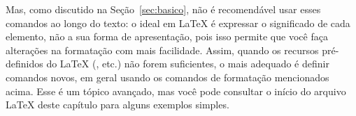 Mas, como discutido na Seção~\ref{sec:basico}, não é recomendável
usar esses comandos ao longo do texto: o ideal em \LaTeX{} é expressar
o significado de cada elemento, não a sua forma de apresentação,
pois isso permite que você faça alterações na formatação com mais
facilidade. Assim, quando os recursos pré-definidos do \LaTeX{}
(,  etc.) não forem suficientes,
o mais adequado é definir comandos novos, em geral usando os comandos
de formatação mencionados acima. Esse é um tópico avançado, mas você
pode consultar o início do arquivo \LaTeX{} deste capítulo para alguns
exemplos simples.

%
%
%
%
%
%

